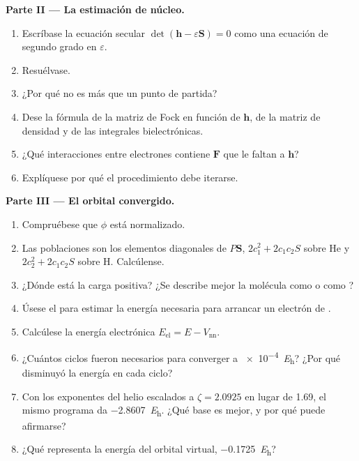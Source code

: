 \begin{problem}
\medskip\noindent\textbf{Parte II --- La estimación de núcleo.}
\begin{enumerate}[resume]
  \item Escríbase la ecuación secular $\det(\mathbf h - \varepsilon\mathbf S) = 0$ como
        una ecuación de segundo grado en $\varepsilon$.
  \item Resuélvase.
  \item ¿Por qué no es más que un punto de partida?
  \item Dese la fórmula de la matriz de Fock en función de $\mathbf h$, de la
        matriz de densidad y de las integrales bielectrónicas.
  \item ¿Qué interacciones entre electrones contiene $\mathbf F$ que le faltan a $\mathbf h$?
  \item Explíquese por qué el procedimiento debe iterarse.
\end{enumerate}

\medskip\noindent\textbf{Parte III --- El orbital convergido.}
\begin{enumerate}[resume]
  \item Compruébese que $\phi$ está normalizado.
  \item Las poblaciones son los elementos diagonales de $P\mathbf S$, $2c_1^2 + 2c_1c_2S$
        sobre He y $2c_2^2 + 2c_1c_2S$ sobre H. Calcúlense.
  \item ¿Dónde está la carga positiva? ¿Se describe mejor la molécula
        como  o como ?
  \item Úsese el  para estimar la energía necesaria para arrancar un
        electrón de .
  \item Calcúlese la energía electrónica $E_{\mathrm{el}} = E - V_{\mathrm{nn}}$.
  \item ¿Cuántos ciclos fueron necesarios para converger a \qty{e-4}{\hartree}? ¿Por qué
        disminuyó la energía en cada ciclo?
  \item Con los exponentes del helio escalados a $\zeta = 2.0925$ en lugar de 1.69, el
        mismo programa da \qty{-2.8607}{\hartree}. ¿Qué base es mejor, y
        por qué puede afirmarse?
  \item ¿Qué representa la energía del orbital virtual, \qty{-0.1725}{\hartree}?
\end{enumerate}


\end{problem}
